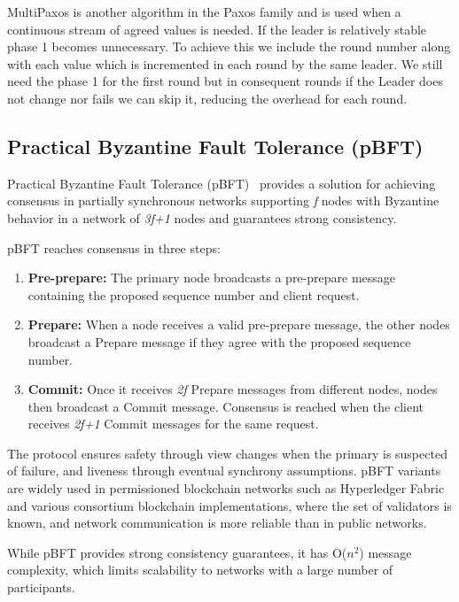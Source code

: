 MultiPaxos is another algorithm in the Paxos family and is used when a
continuous stream of agreed values is needed.
If the leader is relatively stable phase 1 becomes unnecessary. To achieve this
we include the round number along with each value which is incremented in each round
by the same leader. We still need the phase 1 for the first round but in
consequent rounds if the Leader does not change nor fails we can skip it, reducing
the overhead for each round.

\subsection{Practical Byzantine Fault Tolerance (pBFT)}\label{sub:pbft}

Practical Byzantine Fault Tolerance (pBFT)~\cite{pbft} provides a solution for achieving
consensus in partially synchronous networks supporting \textit{f} nodes with Byzantine behavior
in a network of \textit{3f+1} nodes and guarantees strong consistency.

pBFT reaches consensus in three steps:
\begin{enumerate}
  \item \textbf{Pre-prepare:} The primary node broadcasts a pre-prepare message
  containing the proposed sequence number and client request.
  \item \textbf{Prepare:} When a node receives a valid pre-prepare message, the other nodes
  broadcast a Prepare message if they agree with the proposed sequence number.
  \item \textbf{Commit:} Once it receives \textit{2f} Prepare messages from different
  nodes, nodes then broadcast a Commit message. Consensus is reached when the client receives
  \textit{2f+1} Commit messages for the same request.
\end{enumerate}

The protocol ensures safety through view changes when the primary is suspected
of failure, and liveness through eventual synchrony assumptions. pBFT variants
are widely used in permissioned blockchain networks such as Hyperledger Fabric~\cite{hyperledger_fabric}
and various consortium blockchain implementations, where the set of validators
is known, and network communication is more reliable than in public networks.

While pBFT provides strong consistency guarantees, it has O($n^2$) message complexity,
which limits scalability to networks with a large number of participants.

